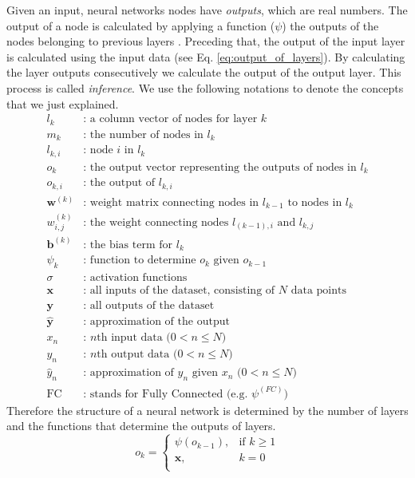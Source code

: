Given an input, neural networks nodes have \textit{outputs}, which are real numbers. The output of a node is calculated by applying a function ($\psi$) the outputs of the nodes belonging to previous layers . Preceding that, the output of the input layer is calculated using the input data (see Eq. \ref{eq:output_of_layers}).  By calculating the layer outputs consecutively we calculate the output of the output layer. This process is called \textit{inference}. We use the following notations to denote the concepts that we just explained.
\begin{equation}
\label{eq:variable_definitions}
\begin{split}
l_k & \text{: a column vector of nodes for layer $k$}\\
m_k & \text{: the number of nodes in $l_k$}\\
l_{k,i}  & \text{: node $i$ in $l_k$}\\
o_{k}  & \text{: the output vector representing the outputs of nodes in $l_{k}$}\\
o_{k,i}  & \text{: the output of $l_{k,i}$}\\
\mathbf{w}^{(k)}  & \text{: weight matrix connecting nodes in $l_{k-1}$ to nodes in $l_{k}$} \\
w^{(k)}_{i,j}  & \text{: the weight connecting nodes $l_{(k-1),i}$ and $l_{k,j}$} \\
\mathbf{b}^{(k)}  & \text{: the bias term for $l_{k}$} \\
\psi_k & \text{: function to determine $o_k$ given $o_{k-1}$}\\
\sigma & \text{: activation functions} \\
\mathbf{x} & \text{: all inputs of the dataset, consisting of $N$ data points} \\
\mathbf{y} & \text{: all outputs of the dataset} \\
\mathbf{\hat y} & \text{: approximation of the output}  \\
x_n & \text{: $n$th input data ($0 < n \leq N$)} \\
y_n & \text{: $n$th output data ($0 < n \leq N$)} \\
\hat y_n & \text{: approximation of $y_n$ given $x_n$ ($0 < n \leq N$)}\\
\text{FC} & \text{: stands for Fully Connected (e.g. $\psi^{(FC)}$)}
\end{split}
\end{equation}
Therefore the structure of a neural network is determined by the number of layers and the functions that determine the outputs of layers.
\begin{equation}
\label{eq:output_of_layers}
    o_k = 
\begin{cases}
    \psi(o_{k-1}), &\text{if } k\geq 1\\
    \mathbf{x},& k = 0\\
\end{cases}
\end{equation}


